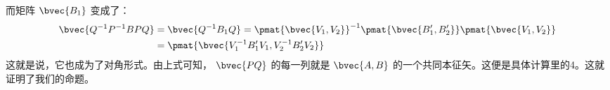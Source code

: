 而矩阵 $\bvec{B_1}$ 变成了：
\begin{equation}
\begin{aligned}
\bvec{Q^{-1}P^{-1}BPQ}&=\bvec{Q^{-1}B_1Q}=\pmat{\bvec{V_1,V_2}}^{-1}\pmat{\bvec{B'_1,B'_2}}\pmat{\bvec{V_1,V_2}}\\
&=\pmat{\bvec{V_1^{-1}B'_1V_1,V_2^{-1}B'_2V_2}}\\
\end{aligned}
\end{equation}
这就是说，它也成为了对角形式。由上式可知， $\bvec{PQ}$ 的每一列就是 $\bvec{A,B}$ 的一个共同本征矢。这便是具体计算里的4。这就证明了我们的命题。


